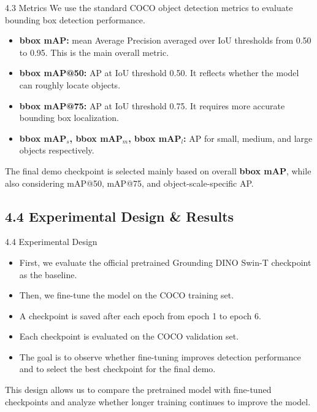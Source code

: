 \documentclass[aspectratio=169,10pt]{beamer}
\begin{document}
\begin{frame}{4.3 Metrics}
\small
We use the standard COCO object detection metrics to evaluate bounding box detection performance.

\vspace{0.8em}

\begin{itemize}
    \item \textbf{bbox mAP:} mean Average Precision averaged over IoU thresholds from 0.50 to 0.95. This is the main overall metric.
    \item \textbf{bbox mAP@50:} AP at IoU threshold 0.50. It reflects whether the model can roughly locate objects.
    \item \textbf{bbox mAP@75:} AP at IoU threshold 0.75. It requires more accurate bounding box localization.
    \item \textbf{bbox mAP$_s$, bbox mAP$_m$, bbox mAP$_l$:} AP for small, medium, and large objects respectively.
\end{itemize}

\vspace{0.8em}

\small
The final demo checkpoint is selected mainly based on overall \textbf{bbox mAP}, while also considering mAP@50, mAP@75, and object-scale-specific AP.
\end{frame}


\subsection{4.4 Experimental Design \& Results}

\begin{frame}{4.4 Experimental Design}
\small
\begin{itemize}
    \item First, we evaluate the official pretrained Grounding DINO Swin-T checkpoint as the baseline.
    \item Then, we fine-tune the model on the COCO training set.
    \item A checkpoint is saved after each epoch from epoch 1 to epoch 6.
    \item Each checkpoint is evaluated on the COCO validation set.
    \item The goal is to observe whether fine-tuning improves detection performance and to select the best checkpoint for the final demo.
\end{itemize}

\vspace{0.8em}

\small
This design allows us to compare the pretrained model with fine-tuned checkpoints and analyze whether longer training continues to improve the model.
\end{frame}
\end{document}
